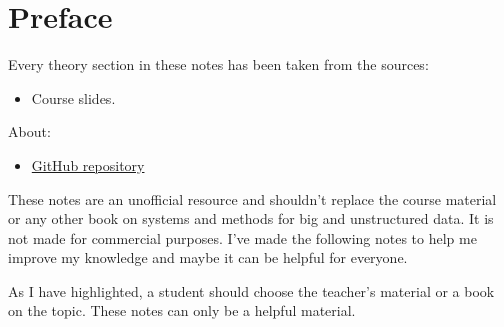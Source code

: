 \section*{Preface}

Every theory section in these notes has been taken from the sources:
\begin{itemize}
    \item Course slides.\cite{smbud-polimi}
\end{itemize}
About:
\begin{itemize}
    \item[\faIcon{github}] \href{https://github.com/PoliMI-HPC-E-notes-projects-AndreVale69/HPC-E-PoliMI-university-notes}{GitHub repository}
        \begin{center}
        \end{center}
\end{itemize}
These notes are an unofficial resource and shouldn't replace the course material or any other book on systems and methods for big and unstructured data. It is not made for commercial purposes. I've made the following notes to help me improve my knowledge and maybe it can be helpful for everyone.

As I have highlighted, a student should choose the teacher's material or a book on the topic. These notes can only be a helpful material.
